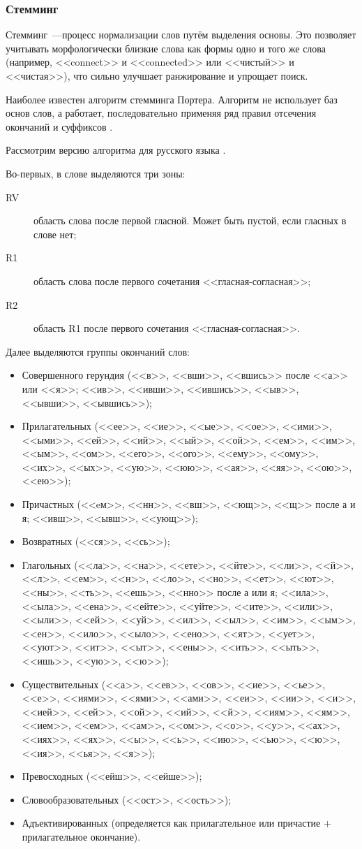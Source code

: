 \subsubsection{Стемминг} \label{sssec:stemming}
Стемминг~---процесс нормализации слов путём выделения основы. Это позволяет учитывать морфологически близкие слова как формы одно и того же слова (например, <<connect>> и <<connected>> или <<чистый>> и <<чистая>>), что сильно улучшает ранжирование и упрощает поиск.

Наиболее известен алгоритм стемминга Портера. Алгоритм не использует баз основ слов, а работает, последовательно применяя ряд правил отсечения окончаний и суффиксов \cite{porter97}.

Рассмотрим версию алгоритма для русского языка \cite{porter06}.

Во-первых, в слове выделяются три зоны:
\begin{description}
  \item[RV] область слова после первой гласной. Может быть пустой, если гласных в слове нет;
  \item[R1] область слова после первого сочетания <<гласная-согласная>>;
  \item[R2] область R1 после первого сочетания <<гласная-согласная>>.
\end{description}

Далее выделяются группы окончаний слов:
\begin{itemize}
  \item Совершенного герундия (<<в>>, <<вши>>, <<вшись>> после <<а>> или <<я>>; <<ив>>, <<ивши>>, <<ившись>>, <<ыв>>, <<ывши>>, <<ывшись>>);
  \item Прилагательных (<<ее>>, <<ие>>, <<ые>>, <<ое>>, <<ими>>, <<ыми>>, <<ей>>, <<ий>>, <<ый>>, <<ой>>, <<ем>>, <<им>>, <<ым>>, <<ом>>, <<его>>, <<ого>>, <<ему>>, <<ому>>, <<их>>, <<ых>>, <<ую>>, <<юю>>, <<ая>>, <<яя>>, <<ою>>, <<ею>>);
  \item Причастных (<<eм>>, <<нн>>, <<вш>>, <<ющ>>, <<щ>> после а и я; <<ивш>>, <<ывш>>, <<ующ>>);
  \item Возвратных (<<ся>>, <<сь>>);
  \item Глагольных (<<ла>>, <<на>>, <<ете>>, <<йте>>, <<ли>>, <<й>>, <<л>>, <<ем>>, <<н>>, <<ло>>, <<но>>, <<ет>>, <<ют>>, <<ны>>, <<ть>>, <<ешь>>, <<нно>> после а или я; <<ила>>, <<ыла>>, <<ена>>, <<ейте>>, <<уйте>>, <<ите>>, <<или>>, <<ыли>>, <<ей>>, <<уй>>, <<ил>>, <<ыл>>, <<им>>, <<ым>>, <<ен>>, <<ило>>, <<ыло>>, <<ено>>, <<ят>>, <<ует>>, <<уют>>, <<ит>>, <<ыт>>, <<ены>>, <<ить>>, <<ыть>>, <<ишь>>, <<ую>>, <<ю>>);
  \item Существительных (<<а>>, <<ев>>, <<ов>>, <<ие>>, <<ье>>, <<е>>, <<иями>>, <<ями>>, <<ами>>, <<еи>>, <<ии>>, <<и>>, <<ией>>, <<ей>>, <<ой>>, <<ий>>, <<й>>, <<иям>>, <<ям>>, <<ием>>, <<ем>>, <<ам>>, <<ом>>, <<о>>, <<у>>, <<ах>>, <<иях>>, <<ях>>, <<ы>>, <<ь>>, <<ию>>, <<ью>>, <<ю>>, <<ия>>, <<ья>>, <<я>>);
  \item Превосходных (<<ейш>>, <<ейше>>);
  \item Словообразовательных (<<ост>>, <<ость>>);
  \item Адъективированных (определяется как прилагательное или причастие + прилагательное окончание).
\end{itemize}

